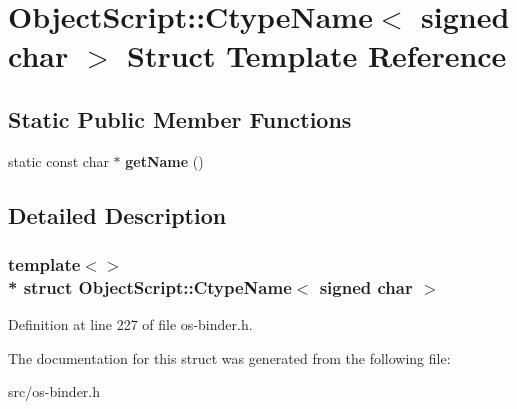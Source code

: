 \hypertarget{struct_object_script_1_1_ctype_name_3_01signed_01char_01_4}{}\section{Object\+Script\+:\+:Ctype\+Name$<$ signed char $>$ Struct Template Reference}
\label{struct_object_script_1_1_ctype_name_3_01signed_01char_01_4}
\subsection*{Static Public Member Functions}
\begin{DoxyCompactItemize}
\item 
static const char $\ast$ {\bfseries get\+Name} ()\hypertarget{struct_object_script_1_1_ctype_name_3_01signed_01char_01_4_a714e3d63620f9d8597f2517ed2e61f1d}{}\label{struct_object_script_1_1_ctype_name_3_01signed_01char_01_4_a714e3d63620f9d8597f2517ed2e61f1d}

\end{DoxyCompactItemize}


\subsection{Detailed Description}
\subsubsection*{template$<$$>$\\*
struct Object\+Script\+::\+Ctype\+Name$<$ signed char $>$}



Definition at line 227 of file os-\/binder.\+h.



The documentation for this struct was generated from the following file\+:\begin{DoxyCompactItemize}
\item 
src/os-\/binder.\+h\end{DoxyCompactItemize}
